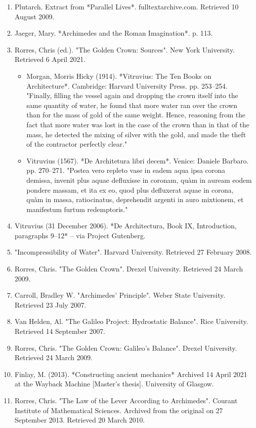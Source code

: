 \begin{enumerate}
\item Plutarch. Extract from *Parallel Lives*. fulltextarchive.com. Retrieved 10 August 2009.
\item Jaeger, Mary. *Archimedes and the Roman Imagination*. p. 113.
\item Rorres, Chris (ed.). "The Golden Crown: Sources". New York University. Retrieved 6 April 2021.
\begin{itemize}
\item Morgan, Morris Hicky (1914). *Vitruvius: The Ten Books on Architecture*. Cambridge: Harvard University Press. pp. 253–254. "Finally, filling the vessel again and dropping the crown itself into the same quantity of water, he found that more water ran over the crown than for the mass of gold of the same weight. Hence, reasoning from the fact that more water was lost in the case of the crown than in that of the mass, he detected the mixing of silver with the gold, and made the theft of the contractor perfectly clear."
\item Vitruvius (1567). *De Architetura libri decem*. Venice: Daniele Barbaro. pp. 270–271. "Postea vero repleto vase in eadem aqua ipsa corona demissa, invenit plus aquae defluxisse in coronam, quàm in auream eodem pondere massam, et ita ex eo, quod plus defluxerat aquae in corona, quàm in massa, ratiocinatus, deprehendit argenti in auro mixtionem, et manifestum furtum redemptoris."
\end{itemize}
\item Vitruvius (31 December 2006). *De Architectura, Book IX, Introduction, paragraphs 9–12* – via Project Gutenberg.
\item "Incompressibility of Water". Harvard University. Retrieved 27 February 2008.
\item Rorres, Chris. "The Golden Crown". Drexel University. Retrieved 24 March 2009.
\item Carroll, Bradley W. "Archimedes' Principle". Weber State University. Retrieved 23 July 2007.
\item Van Helden, Al. "The Galileo Project: Hydrostatic Balance". Rice University. Retrieved 14 September 2007.
\item Rorres, Chris. "The Golden Crown: Galileo's Balance". Drexel University. Retrieved 24 March 2009.
\item Finlay, M. (2013). *Constructing ancient mechanics* Archived 14 April 2021 at the Wayback Machine [Master's thesis]. University of Glasgow.
\item Rorres, Chris. "The Law of the Lever According to Archimedes". Courant Institute of Mathematical Sciences. Archived from the original on 27 September 2013. Retrieved 20 March 2010.

\end{enumerate}
